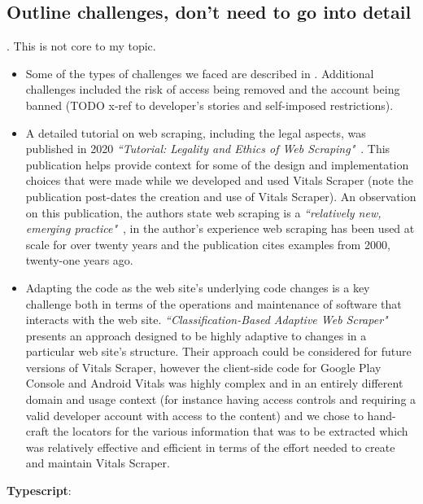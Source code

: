 \subsection{Outline challenges, don't need to go into detail}.
This is not core to my topic. 
\begin{itemize}
    \item Some of the types of challenges we faced are described in \citep{upadhyay2017_articulating_the_construction_of_a_web_scraper_for_massive_data_extraction}. Additional challenges included the risk of access being removed and the account being banned (TODO x-ref to developer's stories and self-imposed restrictions).
    \item A detailed tutorial on web scraping, including the legal aspects, was published in 2020 \emph{``Tutorial: Legality and Ethics of Web Scraping"}~\citep{krotov2020_tutorial_legality_and_ethics_of_web_scraping}. This publication helps provide context for some of the design and implementation choices that were made while we developed and used Vitals Scraper (note the publication post-dates the creation and use of Vitals Scraper). An observation on this publication, the authors state web scraping is a \emph{``relatively new, emerging practice"}~\citep[p.556]{krotov2020_tutorial_legality_and_ethics_of_web_scraping}, in the author's experience web scraping has been used at scale for over twenty years and the publication cites examples from 2000, twenty-one years ago. 
    \item Adapting the code as the web site's underlying code changes is a key challenge both in terms of the operations and maintenance of software that interacts with the web site. \emph{``Classification-Based Adaptive Web Scraper"}~\citep{ujwal2017_classification_based_adaptive_web_scraper} presents an approach designed to be highly adaptive to changes in a particular web site's structure. Their approach could be considered for future versions of Vitals Scraper, however the client-side code for Google Play Console and Android Vitals was highly complex and in an entirely different domain and usage context (for instance having access controls and requiring a valid developer account with access to the content) and we chose to hand-craft the locators for the various information that was to be extracted which was relatively effective and efficient in terms of the effort needed to create and maintain Vitals Scraper.
\end{itemize}

\textbf{Typescript}:

